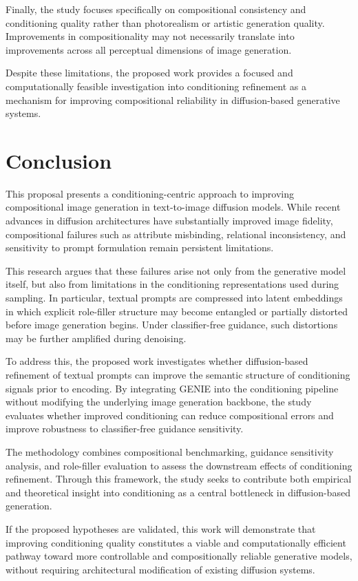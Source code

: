 \documentclass[a4paper,twoside,12pt]{report}
\begin{document}
Finally, the study focuses specifically on compositional consistency and conditioning quality rather than photorealism or artistic generation quality. Improvements in compositionality may not necessarily translate into improvements across all perceptual dimensions of image generation.

Despite these limitations, the proposed work provides a focused and computationally feasible investigation into conditioning refinement as a mechanism for improving compositional reliability in diffusion-based generative systems.




\chapter{Conclusion}

This proposal presents a conditioning-centric approach to improving compositional image generation in text-to-image diffusion models. While recent advances in diffusion architectures have substantially improved image fidelity, compositional failures such as attribute misbinding, relational inconsistency, and sensitivity to prompt formulation remain persistent limitations.

This research argues that these failures arise not only from the generative model itself, but also from limitations in the conditioning representations used during sampling. In particular, textual prompts are compressed into latent embeddings in which explicit role-filler structure may become entangled or partially distorted before image generation begins. Under classifier-free guidance, such distortions may be further amplified during denoising.

To address this, the proposed work investigates whether diffusion-based refinement of textual prompts can improve the semantic structure of conditioning signals prior to encoding. By integrating GENIE into the conditioning pipeline without modifying the underlying image generation backbone, the study evaluates whether improved conditioning can reduce compositional errors and improve robustness to classifier-free guidance sensitivity.

The methodology combines compositional benchmarking, guidance sensitivity analysis, and role-filler evaluation to assess the downstream effects of conditioning refinement. Through this framework, the study seeks to contribute both empirical and theoretical insight into conditioning as a central bottleneck in diffusion-based generation.

If the proposed hypotheses are validated, this work will demonstrate that improving conditioning quality constitutes a viable and computationally efficient pathway toward more controllable and compositionally reliable generative models, without requiring architectural modification of existing diffusion systems.

\nocite{*}

\end{document}

